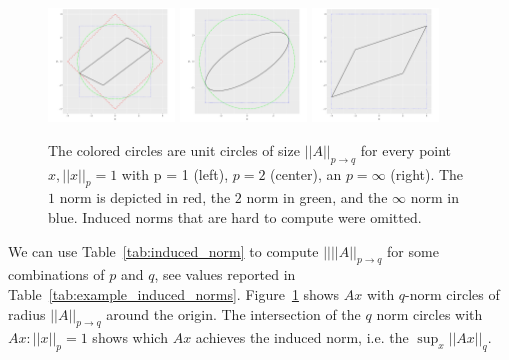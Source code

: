 \documentclass{article}
\begin{document}
\begin{figure}[ht]
    \centering
    \includegraphics[width=0.3\textwidth]{norms_A_unit_circle_1.pdf}
    \includegraphics[width=0.3\textwidth]{norms_A_unit_circle_2.pdf}
    \includegraphics[width=0.3\textwidth]{norms_A_unit_circle_inf.pdf}
    \caption{The colored circles are unit circles of size $||A||_{p \to q}$ for every point $x, ||x||_p = 1$ with p = 1 (left), $p = 2$ (center), an $p = \infty$ (right). 
    The $1$ norm is depicted in red, the $2$ norm in green, and the $\infty$ norm in blue.
    Induced norms that are hard to compute were omitted.}
    \label{fig:norms_output}
\end{figure}

We can use Table~\ref{tab:induced_norm} to compute $||||A||_{p \to q}$ for some combinations of $p$ and $q$, see values reported in Table~\ref{tab:example_induced_norms}. Figure~\ref{fig:norms_output} shows $Ax$ with $q$-norm circles of radius $||A||_{p \to q}$ around the origin. The intersection of the $q$ norm circles with $Ax: ||x||_p = 1$ shows which $Ax$ achieves the induced norm, i.e. the $\sup_x ||Ax||_q$.
\end{document}
